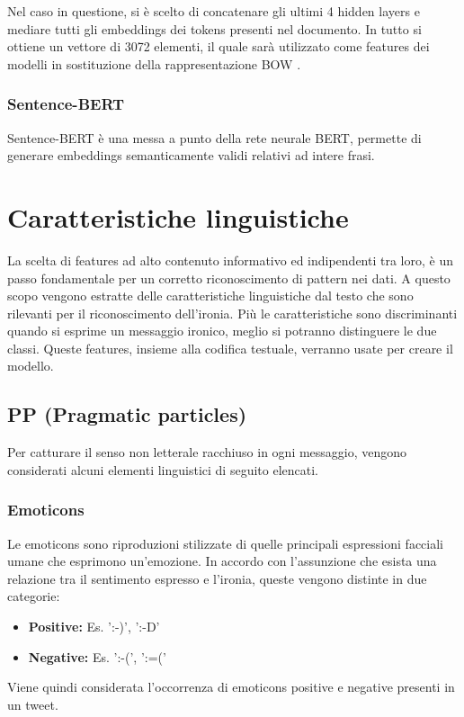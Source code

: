 \documentclass[oneside]{book}
\begin{document}
\noindent
Nel caso in questione, si è scelto di concatenare gli ultimi 4 hidden layers e mediare tutti gli embeddings dei tokens presenti nel documento. In tutto si ottiene un vettore di 3072 elementi, il quale sarà utilizzato come features dei modelli in sostituzione della rappresentazione BOW \cite{berttutorial}.

\subsubsection{Sentence-BERT}
Sentence-BERT\cite{sentencebert} è una messa a punto della rete neurale BERT, permette di generare embeddings semanticamente validi relativi ad intere frasi.

\section{Caratteristiche linguistiche}
La scelta di features ad alto contenuto informativo ed indipendenti tra loro, è un passo fondamentale per un corretto riconoscimento di pattern nei dati.
A questo scopo vengono estratte delle caratteristiche linguistiche dal testo che sono rilevanti per il riconoscimento dell'ironia. Più le caratteristiche sono discriminanti quando si esprime un messaggio ironico, meglio si potranno distinguere le due classi. Queste features, insieme alla codifica testuale, verranno usate per creare il modello.

\subsection{PP (Pragmatic particles)}
Per catturare il senso non letterale racchiuso in ogni messaggio, vengono considerati alcuni elementi linguistici di seguito elencati.

\subsubsection{Emoticons}
Le emoticons sono riproduzioni stilizzate di quelle principali espressioni facciali umane che esprimono un'emozione. In accordo con l'assunzione che esista una relazione tra il sentimento espresso e l'ironia, queste vengono distinte in due categorie:
\begin{itemize}
	\item
	\textbf{Positive: } Es. ':-)', ':-D'
	\item
	\textbf{Negative: } Es. ':-(', ':=('
\end{itemize}
Viene quindi considerata l'occorrenza di emoticons positive e negative presenti in un tweet.
\end{document}
